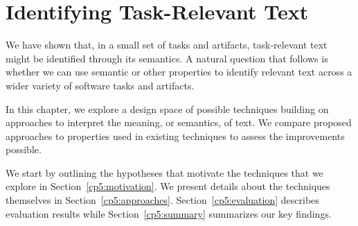 \setcounter{chapter}{4}
\setcounter{rq}{1}


\chapter{Identifying Task-Relevant Text}
\label{ch:identifying}

We have  shown that, in a small set of tasks and artifacts, task-relevant text might be identified through its semantics.
A natural question that follows is whether we can use semantic or other properties to identify relevant text across a wider variety of software tasks and artifacts.

In this chapter, we explore a design space of possible techniques building on approaches to
interpret the meaning, or semantics, of text. We compare proposed approaches to properties
used in existing techniques to assess the improvements possible. 

We start by outlining the hypotheses that motivate the techniques that we explore in Section~\ref{cp5:motivation}.
We present details about the techniques themselves in Section~\ref{cp5:approaches}.
Section~\ref{cp5:evaluation} describes evaluation results while
Section~\ref{cp5:summary} summarizes our key findings.

















